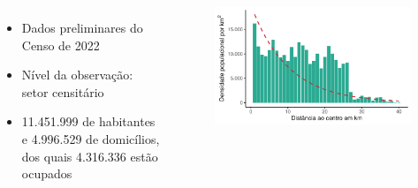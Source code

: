 \documentclass[%
    8pt, 
    aspectratio=169,
]{beamer}
\begin{document}
\begin{frame}
\begin{columns}
        \begin{itemize}
            \item Dados preliminares do Censo de 2022
            \item Nível da observação: setor censitário
            \item 11.451.999 de habitantes e 4.996.529 de domicílios, dos quais 4.316.336 estão ocupados
        \end{itemize}
        \begin{figure}
            \centering
            \includegraphics[width = .7\textwidth]{imagens/densidade_distcentro.pdf}
        \end{figure}
    \end{columns}
\end{frame}
\end{document}
